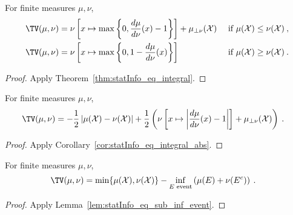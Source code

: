 \begin{lemma}
  \label{lem:tv_eq_integral}
  For finite measures $\mu, \nu$,
  \begin{align*}
  \TV(\mu, \nu)
  &= \nu\left[ x \mapsto \max \left\{0 , \frac{d \mu}{d\nu}(x) - 1 \right\} \right] + \mu_{\perp \nu}(\mathcal X) & \text{ if } \mu(\mathcal X) \le \nu(\mathcal X)
  \: , \\
  \TV(\mu, \nu)
  &= \nu\left[ x \mapsto \max \left\{0 , 1 - \frac{d \mu}{d\nu}(x) \right\} \right] & \text{ if } \mu(\mathcal X) \ge \nu(\mathcal X)
  \: .
  \end{align*}
\end{lemma}

\begin{proof}%
{}
Apply Theorem~\ref{thm:statInfo_eq_integral}.
\end{proof}


\begin{lemma}
  \label{lem:tv_eq_integral_abs}
  For finite measures $\mu, \nu$,
  \begin{align*}
  \TV(\mu, \nu)
  &= -\frac{1}{2} \left\vert \mu(\mathcal X) - \nu(\mathcal X)\right\vert + \frac{1}{2}\left( \nu\left[ x \mapsto \left\vert \frac{d \mu}{d\nu}(x) - 1 \right\vert \right]  + \mu_{\perp \nu}(\mathcal X)\right)
  \: .
  \end{align*}
\end{lemma}

\begin{proof}%
{}
Apply Corollary~\ref{cor:statInfo_eq_integral_abs}.
\end{proof}


\begin{lemma}
  \label{lem:tv_eq_sub_inf_event}
  For finite measures $\mu, \nu$,
  \begin{align*}
  \TV(\mu, \nu)
  &= \min\{\mu(\mathcal X), \nu(\mathcal X)\} - \inf_{E \text{ event}} \left( \mu(E) + \nu(E^c) \right)
  \: .
  \end{align*}
\end{lemma}

\begin{proof}%
{}
Apply Lemma~\ref{lem:statInfo_eq_sub_inf_event}.
\end{proof}



